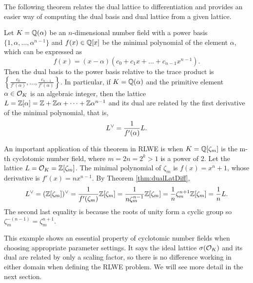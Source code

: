\documentclass[../main.tex]{subfiles}
\begin{document}
The following theorem relates the dual lattice to differentiation and provides an easier way of computing the dual basis and dual lattice from a given lattice. 

\begin{theorem}
\label{thm:dualLatDiff}
\reversemarginpar
{}
Let $K=\mathbb{Q}(\alpha)$ be an $n$-dimensional number field with a power basis $\{1, \alpha, \dots, \alpha^{n-1}\}$ and $f(x) \in \mathbb{Q}[x]$ be the minimal polynomial of the element $\alpha$, which can be expressed as 
\begin{equation*}
    f(x) = (x-\alpha)(c_0 + c_1 x + \dots + c_{n-1} x^{n-1}).
\end{equation*}
Then the dual basis to the power basis relative to the trace product is $\left\{\frac{c_0}{f'(\alpha)}, \dots, \frac{c_{n-1}}{f'(\alpha)}\right\}$.
%
In particular, if $K=\mathbb{Q}(\alpha)$ and the primitive element $\alpha \in \mathcal{O}_K$ is an algebraic integer, then the lattice $L=\mathbb{Z}[\alpha]=\mathbb{Z} + \mathbb{Z}\alpha + \dots + \mathbb{Z} \alpha^{n-1}$ and its dual are related by the first derivative of the minimal polynomial, that is, 
\begin{equation*}
    L^{\vee} = \frac{1}{f'(\alpha)}L.
\end{equation*}
\end{theorem}


\begin{example}
\label{ex:dualL}
An important application of this theorem in RLWE is when $K=\mathbb{Q}[\zeta_m]$ is the m-th cyclotomic number field, where $m=2n=2^k>1$ is a power of 2. Let the lattice $L=\mathcal{O}_K=\mathbb{Z}[\zeta_m]$. The minimal polynomial of $\zeta_m$ is $f(x)=x^n+1$, whose derivative is $f'(x)=nx^{n-1}$. By Theorem \ref{thm:dualLatDiff},
\begin{equation*}
    L^{\vee}=(\mathbb{Z}[\zeta_m])^{\vee} = \frac{1}{f'(\zeta_m)} \mathbb{Z}[\zeta_m] = \frac{1}{n\zeta_m^{n-1}} \mathbb{Z}[\zeta_m] = \frac{1}{n} \zeta_m^{n+1} \mathbb{Z}[\zeta_m]=\frac{1}{n}L.
\end{equation*}
The second last equality is because the roots of unity form a cyclic group so $\zeta_m^{-(n-1)} = \zeta_m^{n+1}$.
\end{example}
This example shows an essential property of cyclotomic number fields when choosing appropriate parameter settings. It says the ideal lattice $\sigma(\mathcal{O}_K)$ and its dual are related by only a scaling factor, so there is no difference working in either domain when defining the RLWE problem. We will see more detail in the next section. 
\end{document}
